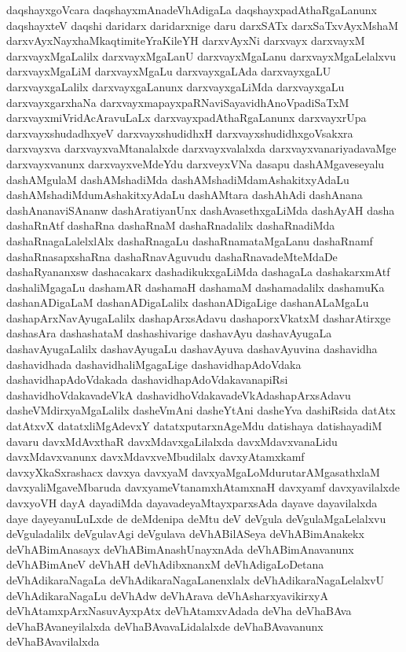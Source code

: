 {daqshayxgoVcara
daqshayxmAnadeVhAdigaLa
daqshayxpadAthaRgaLanunx
daqshayxteV
daqshi
daridarx
daridarxnige
daru
darxSATx
darxSaTxvAyxMshaM
darxvAyxNayxhaMkaqtimiteYraKileYH
darxvAyxNi
darxvayx
darxvayxM
darxvayxMgaLalilx
darxvayxMgaLanU
darxvayxMgaLanu
darxvayxMgaLelalxvu
darxvayxMgaLiM
darxvayxMgaLu
darxvayxgaLAda
darxvayxgaLU
darxvayxgaLalilx
darxvayxgaLanunx
darxvayxgaLiMda
darxvayxgaLu
darxvayxgarxhaNa
darxvayxmapayxpaRNaviSayavidhAnoVpadiSaTxM
darxvayxmiVridAcAravuLaLx
darxvayxpadAthaRgaLanunx
darxvayxrUpa
darxvayxshudadhxyeV
darxvayxshudidhxH
darxvayxshudidhxgoVsakxra
darxvayxva
darxvayxvaMtanalalxde
darxvayxvalalxda
darxvayxvanariyadavaMge
darxvayxvanunx
darxvayxveMdeYdu
darxveyxVNa
dasapu
dashAMgaveseyalu
dashAMgulaM
dashAMshadiMda
dashAMshadiMdamAshakitxyAdaLu
dashAMshadiMdumAshakitxyAdaLu
dashAMtara
dashAhAdi
dashAnana
dashAnanaviSAnanw
dashAratiyanUnx
dashAvasethxgaLiMda
dashAyAH
dasha
dashaRnAtf
dashaRna
dashaRnaM
dashaRnadalilx
dashaRnadiMda
dashaRnagaLalelxlAlx
dashaRnagaLu
dashaRnamataMgaLanu
dashaRnamf
dashaRnasapxshaRna
dashaRnavAguvudu
dashaRnavadeMteMdaDe
dashaRyananxsw
dashacakarx
dashadikukxgaLiMda
dashagaLa
dashakarxmAtf
dashaliMgagaLu
dashamAR
dashamaH
dashamaM
dashamadalilx
dashamuKa
dashanADigaLaM
dashanADigaLalilx
dashanADigaLige
dashanALaMgaLu
dashapArxNavAyugaLalilx
dashapArxsAdavu
dashaporxVkatxM
dasharAtirxge
dashasAra
dashashataM
dashashivarige
dashavAyu
dashavAyugaLa
dashavAyugaLalilx
dashavAyugaLu
dashavAyuva
dashavAyuvina
dashavidha
dashavidhada
dashavidhaliMgagaLige
dashavidhapAdoVdaka
dashavidhapAdoVdakada
dashavidhapAdoVdakavanapiRsi
dashavidhoVdakavadeVkA
dashavidhoVdakavadeVkAdashapArxsAdavu
dasheVMdirxyaMgaLalilx
dasheVmAni
dasheYtAni
dasheYva
dashiRsida
datAtx
datAtxvX
datatxliMgAdevxY
datatxputarxnAgeMdu
datishaya
datishayadiM
davaru
davxMdAvxthaR
davxMdavxgaLilalxda
davxMdavxvanaLidu
davxMdavxvanunx
davxMdavxveMbudilalx
davxyAtamxkamf
davxyXkaSxrashacx
davxya
davxyaM
davxyaMgaLoMdurutarAMgasathxlaM
davxyaliMgaveMbaruda
davxyameVtanamxhAtamxnaH
davxyamf
davxyavilalxde
davxyoVH
dayA
dayadiMda
dayavadeyaMtayxparxsAda
dayave
dayavilalxda
daye
dayeyanuLuLxde
de
deMdenipa
deMtu
deV
deVgula
deVgulaMgaLelalxvu
deVguladalilx
deVgulavAgi
deVgulava
deVhABilASeya
deVhABimAnakekx
deVhABimAnasayx
deVhABimAnashUnayxnAda
deVhABimAnavanunx
deVhABimAneV
deVhAH
deVhAdibxnanxM
deVhAdigaLoDetana
deVhAdikaraNagaLa
deVhAdikaraNagaLanenxlalx
deVhAdikaraNagaLelalxvU
deVhAdikaraNagaLu
deVhAdw
deVhArava
deVhAsharxyavikirxyA
deVhAtamxpArxNasuvAyxpAtx
deVhAtamxvAdada
deVha
deVhaBAva
deVhaBAvaneyilalxda
deVhaBAvavaLidalalxde
deVhaBAvavanunx
deVhaBAvavilalxda
}
